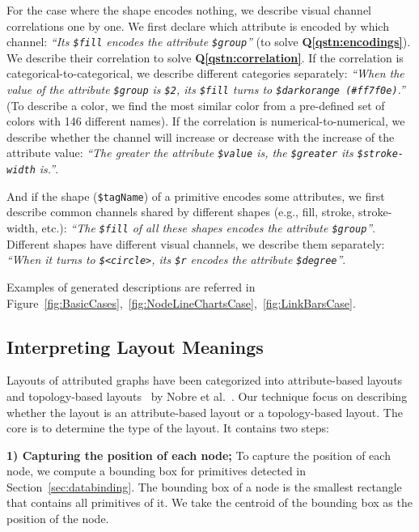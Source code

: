 For the case where the shape encodes nothing, we describe visual channel correlations one by one.
We first declare which attribute is encoded by which channel: \textit{``Its \texttt{\$fill} encodes the attribute \texttt{\$group}''} (to solve \textbf{Q\ref{qstn:encodings}}).
We describe their correlation to solve \textbf{Q\ref{qstn:correlation}}.
If the correlation is categorical-to-categorical, we describe different categories separately: \textit{``When the value of the attribute \texttt{\$group} is \texttt{\$2}, its \texttt{\$fill} turns to \texttt{\$darkorange (\#ff7f0e)}.''} (To describe a color, we find the most similar color from a pre-defined set of colors with 146 different names).
If the correlation is numerical-to-numerical, we describe whether the channel will increase or decrease with the increase of the attribute value: \textit{``The greater the attribute \texttt{\$value} is, the \texttt{\$greater} its \texttt{\$stroke-width} is.''}.

And if the shape (\texttt{\$tagName}) of a primitive encodes some attributes, we first describe common channels shared by different shapes (e.g., fill, stroke, stroke-width, etc.): \textit{``The \texttt{\$fill} of all these shapes encodes the attribute \texttt{\$group}''}.
Different shapes have different visual channels, we describe them separately: \textit{``When it turns to \texttt{\$<circle>}, its \texttt{\$r} encodes the attribute \texttt{\$degree}''}.

Examples of generated descriptions are referred in Figure~\ref{fig:BasicCases},~\ref{fig:NodeLineChartsCase},~\ref{fig:LinkBarsCase}.

\subsection{Interpreting Layout Meanings}
Layouts of attributed graphs have been categorized into attribute-based layouts~\cite{} and topology-based layouts~\cite{} by Nobre et al.~\cite{DBLP:journals/cgf/NobreMSL19}.
Our technique focus on describing whether the layout is an attribute-based layout or a topology-based layout.
The core is to determine the type of the layout.
It contains two steps: 

\textbf{1) Capturing the position of each node;} To capture the position of each node, we compute a bounding box for primitives detected in Section~\ref{sec:databinding}.
The bounding box of a node is the smallest rectangle that contains all primitives of it.
We take the centroid of the bounding box as the position of the node.

